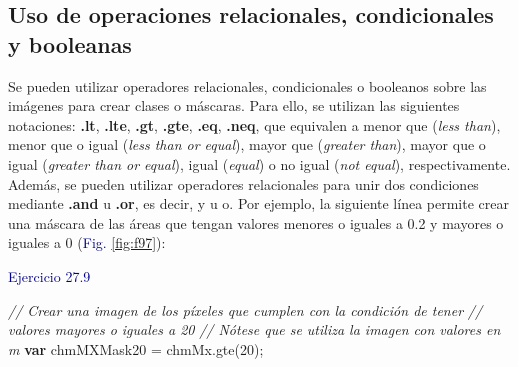 \documentclass[
  12pt,
  letterpaper,
  twoside]{book}
\newenvironment{Shaded}{\begin{snugshade}}{\end{snugshade}}
\newcommand{\CommentTok}[1]{\textcolor[rgb]{0.24,0.58,0.00}{\textit{#1}}}
\newcommand{\ControlFlowTok}[1]{\textcolor[rgb]{0.00,0.00,0.00}{\textbf{#1}}}
\newcommand{\DecValTok}[1]{\textcolor[rgb]{0.28,0.53,0.93}{#1}}
\newcommand{\FunctionTok}[1]{\textcolor[rgb]{0.48,0.12,0.64}{#1}}
\newcommand{\NormalTok}[1]{#1}
\newcommand{\OperatorTok}[1]{\textcolor[rgb]{0.00,0.00,0.00}{#1}}
\newcommand\boldpurple[1]{\textcolor{darkpurple}{\textbf{#1}}}
\begin{document}
\hypertarget{uso-de-operaciones-relacionales-condicionales-y-booleanas}{%
\subsection*{Uso de operaciones relacionales, condicionales y booleanas}\label{uso-de-operaciones-relacionales-condicionales-y-booleanas}}

Se pueden utilizar operadores relacionales, condicionales o booleanos sobre las imágenes para crear clases o máscaras. Para ello, se utilizan las siguientes notaciones: \boldpurple{.lt}, \boldpurple{.lte}, \boldpurple{.gt}, \boldpurple{.gte}, \boldpurple{.eq}, \boldpurple{.neq}, que equivalen a menor que (\emph{less than}), menor que o igual (\emph{less than or equal}), mayor que (\emph{greater than}), mayor que o igual (\emph{greater than or equal}), igual (\emph{equal}) o no igual (\emph{not equal}), respectivamente. Además, se pueden utilizar operadores relacionales para unir dos condiciones mediante \boldpurple{.and} u \boldpurple{.or}, es decir, y u o. Por ejemplo, la siguiente línea permite crear una máscara de las áreas que tengan valores menores o iguales a 0.2 y mayores o iguales a 0 (\textcolor{darkblue}{Fig.} \ref{fig:f97}):

\textcolor{darkblue}{Ejercicio 27.9}

\begin{Shaded}
\begin{Highlighting}[]
\CommentTok{// Crear una imagen de los píxeles que cumplen con la condición de tener }
\CommentTok{// valores mayores o iguales a 20}
\CommentTok{// Nótese que se utiliza la imagen con valores en m}
\ControlFlowTok{var}\NormalTok{ chmMXMask20 }\OperatorTok{=}\NormalTok{ chmMx}\OperatorTok{.}\FunctionTok{gte}\NormalTok{(}\DecValTok{20}\NormalTok{)}\OperatorTok{;}
\end{Highlighting}
\end{Shaded}
\end{document}
